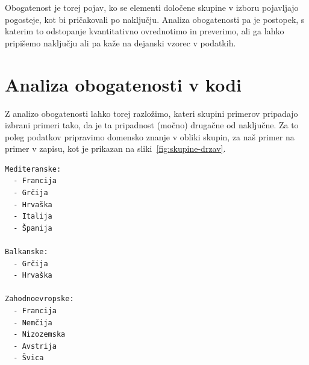 Obogatenost je torej pojav, ko se elementi določene skupine v izboru pojavljajo pogosteje, kot bi pričakovali po naključju. Analiza obogatenosti pa je postopek, s katerim to odstopanje kvantitativno ovrednotimo in preverimo, ali ga lahko pripišemo naključju ali pa kaže na dejanski vzorec v podatkih.

\section{Analiza obogatenosti v kodi}

Z analizo obogatenosti lahko torej razložimo, kateri skupini primerov pripadajo izbrani primeri tako, da je ta pripadnost (močno) drugačne od naključne. Za to poleg podatkov pripravimo domensko znanje v obliki skupin, za naš primer na primer v zapisu, kot je prikazan na sliki~\ref{fig:skupine-drzav}.

\begin{marginfigure}
\caption{Zapis v obliki YAML s primerom določitve skupin držav.}
\label{fig:skupine-drzav}
\footnotesize
\begin{verbatim}
Mediteranske:
  - Francija
  - Grčija
  - Hrvaška
  - Italija
  - Španija

Balkanske:
  - Grčija
  - Hrvaška

Zahodnoevropske:
  - Francija
  - Nemčija
  - Nizozemska
  - Avstrija
  - Švica
\end{verbatim}
\end{marginfigure}

